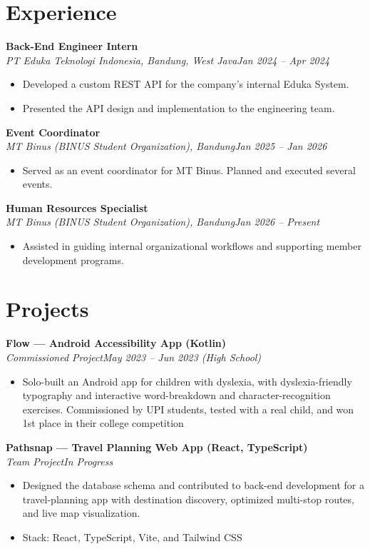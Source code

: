 \documentclass[10.5pt,a4paper]{article}
\newcommand{\cvheading}[3]{%
  \noindent\textbf{#1}\\
  \textit{#2}\hfill\textit{#3}\par
}
\begin{document}
\section*{Experience}

\cvheading{Back-End Engineer Intern}{PT Eduka Teknologi Indonesia, Bandung, West Java}{Jan 2024 -- Apr 2024}
\begin{itemize}
  \item Developed a custom REST API for the company's internal Eduka System.
  \item Presented the API design and implementation to the engineering team.
\end{itemize}

\cvheading{Event Coordinator}{MT Binus (BINUS Student Organization), Bandung}{Jan 2025 -- Jan 2026}
\begin{itemize}
  \item  Served as an event coordinator for MT Binus. Planned and executed several events.
\end{itemize}

\cvheading{Human Resources Specialist}{MT Binus (BINUS Student Organization), Bandung}{Jan 2026 -- Present}
\begin{itemize}
  \item  Assisted in guiding internal organizational workflows and supporting member development programs.
\end{itemize}

\section*{Projects}

\cvheading{Flow --- Android Accessibility App (Kotlin)}{Commissioned Project}{May 2023 -- Jun 2023 (High School)}
\begin{itemize}
  \item Solo-built an Android app for children with dyslexia, with dyslexia-friendly typography and interactive word-breakdown and character-recognition exercises. Commissioned by UPI students, tested with a real child, and won 1st place in their college competition
\end{itemize}

\cvheading{Pathsnap --- Travel Planning Web App (React, TypeScript)}{Team Project}{In Progress}
\begin{itemize}
  \item Designed the database schema and contributed to back-end development for a travel-planning app with destination discovery, optimized multi-stop routes, and live map visualization.
  \item Stack: React, TypeScript, Vite, and Tailwind CSS
\end{itemize}
\end{document}

